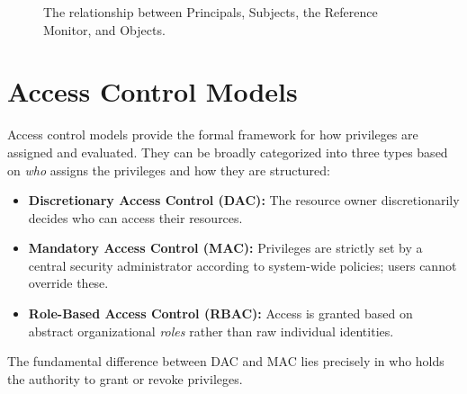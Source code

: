 \begin{figure}[htpb]
    \centering
    \caption{The relationship between Principals, Subjects, the Reference Monitor, and Objects.}
    \label{fig:ref_monitor}
\end{figure}

\section{Access Control Models}
Access control models provide the formal framework for how privileges are assigned and evaluated. They can be broadly categorized into three types based on \textit{who} assigns the privileges and how they are structured:
\begin{itemize}
    \item \textbf{Discretionary Access Control (DAC):} The resource owner discretionarily decides who can access their resources.
    \item \textbf{Mandatory Access Control (MAC):} Privileges are strictly set by a central security administrator according to system-wide policies; users cannot override these.
    \item \textbf{Role-Based Access Control (RBAC):} Access is granted based on abstract organizational \textit{roles} rather than raw individual identities.
\end{itemize}
The fundamental difference between DAC and MAC lies precisely in who holds the authority to grant or revoke privileges.

